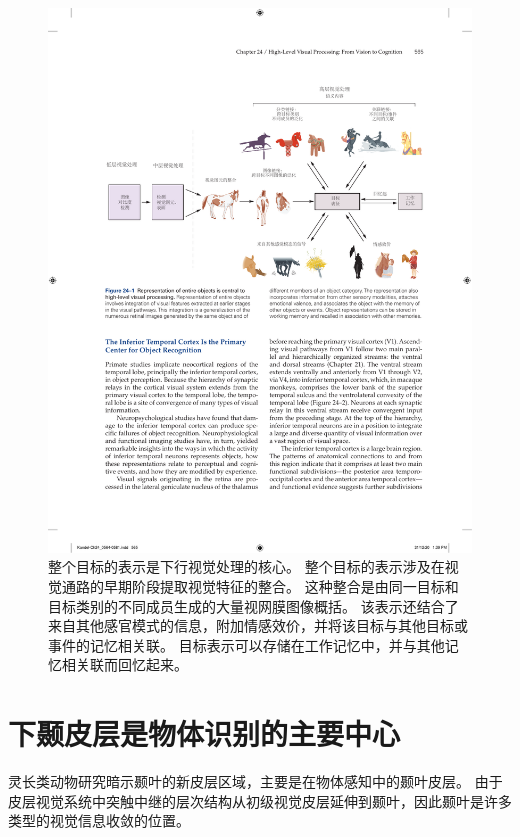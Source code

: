 \begin{figure}[htbp]
	\centering
	\includegraphics[width=1.0\linewidth]{chap24/fig_24_1}
	\caption{整个目标的表示是下行视觉处理的核心。
		整个目标的表示涉及在视觉通路的早期阶段提取视觉特征的整合。
		这种整合是由同一目标和目标类别的不同成员生成的大量视网膜图像概括。
		该表示还结合了来自其他感官模式的信息，附加情感效价，并将该目标与其他目标或事件的记忆相关联。
		目标表示可以存储在工作记忆中，并与其他记忆相关联而回忆起来。}
	\label{fig:24_1}
\end{figure}



\section{下颞皮层是物体识别的主要中心}

灵长类动物研究暗示颞叶的新皮层区域，主要是在物体感知中的颞叶皮层。
由于皮层视觉系统中突触中继的层次结构从初级视觉皮层延伸到颞叶，因此颞叶是许多类型的视觉信息收敛的位置。


